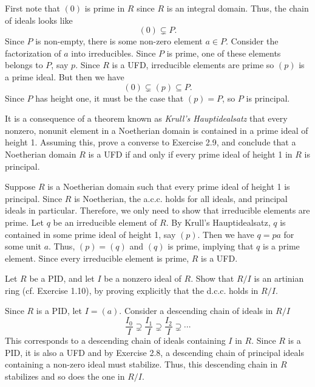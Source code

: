 \documentclass[../../master.tex]{subfiles}
\begin{document}
    \begin{solution}
        First note that $(0)$ is prime in $R$ since $R$ is an integral domain.
        Thus, the chain of ideals looks like
        \[
            (0) \subsetneq P.
        \] 
        Since $P$ is non-empty, there is some non-zero element $a \in P$.
        Consider the factorization of $a$ into irreducibles. Since $P$ is prime,
        one of these elements belongs to $P$, say $p$. Since $R$ is a UFD,
        irreducible elements are prime so $(p)$ is a prime ideal. But then we
        have
        \[
            (0) \subsetneq (p) \subseteq P.
        \] 
        Since $P$ has height one, it must be the case that $(p) = P$, so $P$ is
        principal.
    \end{solution}

    \begin{problem}
        It is a consequence of a theorem known as \textit{Krull's
        Hauptidealsatz} that every nonzero, nonunit element in a Noetherian domain is
        contained in a prime ideal of height 1. Assuming this, prove a converse
        to Exercise 2.9, and conclude that a Noetherian domain $R$ is a UFD if
        and only if every prime ideal of height 1 in $R$ is principal.
    \end{problem}

    \begin{solution}
        Suppose $R$ is a Noetherian domain such that every prime ideal of height
        1 is principal. Since $R$ is Noetherian, the a.c.c. holds for all
        ideals, and principal ideals in particular. Therefore, we only need to
        show that irreducible elements are prime. Let $q$ be an irreducible
        element of $R$. By Krull's Hauptidealsatz, $q$ is contained in some
        prime ideal of height 1, say $(p)$. Then we have $q = pa$ for some unit
        $a$. Thus, $(p) = (q)$ and $(q)$ is prime, implying that $q$ is a prime
        element. Since every irreducible element is prime, $R$ is a UFD.
    \end{solution}

    \begin{problem}
        Let $R$ be a PID, and let $I$ be a nonzero ideal of $R$. Show that $R /
        I$ is an artinian ring (cf. Exercise 1.10), by proving explicitly that
        the d.c.c. holds in $R / I$.
    \end{problem}

    \begin{solution}
        Since $R$ is a PID, let $I = (a)$. Consider a descending chain of ideals
        in $R / I$
        \[
        \frac{I_0}{I} \supsetneq \frac{I_1}{I} \supsetneq \frac{I_2}{I}
        \supsetneq \cdots
        \] 
        This corresponds to a descending chain of ideals containing $I$ in $R$.
        Since $R$ is a PID, it is also a UFD and by Exercise 2.8, a descending
        chain of principal ideals containing a non-zero ideal must stabilize.
        Thus, this descending chain in $R$ stabilizes and so does the one in $R
        / I$.
    \end{solution}
\end{document}
